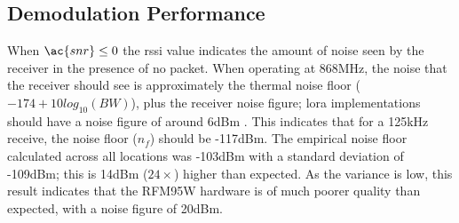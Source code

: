 \subsection{Demodulation Performance}
When $\ac{snr} \leq 0$ the \ac{rssi} value indicates the amount of noise seen by the receiver in the presence of no packet. When operating at 868MHz, the noise that the receiver should see is approximately the thermal noise floor ($-174+10log_{10}(BW)$), plus the receiver noise figure; \ac{lora} implementations should have a noise figure of around 6dBm \cite{3YP:LORA_MOD_BASICS}. This indicates that for a 125kHz receive, the noise floor ($n_f$) should be -117dBm. The empirical noise floor calculated across all locations was -103dBm with a standard deviation of -109dBm; this is 14dBm ($24\times$) higher than expected. As the variance is low, this result indicates that the RFM95W hardware is of much poorer quality than expected, with a noise figure of 20dBm.

